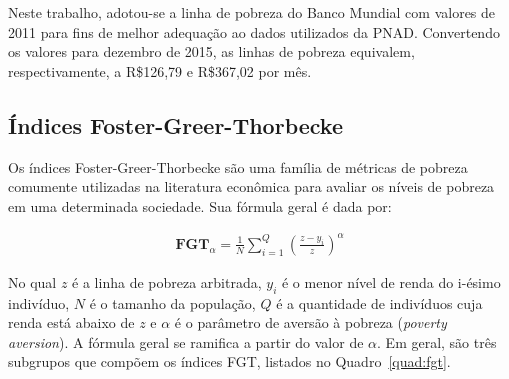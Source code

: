 Neste trabalho, adotou-se a linha de pobreza do Banco Mundial com valores de 2011 para fins de melhor adequação ao dados utilizados da PNAD. Convertendo os valores para dezembro de 2015, as linhas de pobreza equivalem, respectivamente, a R\$126,79 e R\$367,02 por mês. 


\subsection{Índices Foster-Greer-Thorbecke}

Os índices Foster-Greer-Thorbecke são uma família de métricas de pobreza comumente utilizadas na literatura econômica para avaliar os níveis de pobreza em uma determinada sociedade. Sua fórmula geral é dada por:

\begin{align}
	\textbf{FGT}_\alpha = \frac{1}{N} \sum_{i=1}^{Q} \left( \frac{z - y_i}{z} \right)^{\alpha}
\end{align}

No qual $z$ é a linha de pobreza arbitrada, $y_i$ é o menor nível de renda do i-ésimo indivíduo, $N$ é o tamanho da população, $Q$ é a quantidade de indivíduos cuja renda está abaixo de $z$ e $\alpha$ é o parâmetro de aversão à pobreza (\textit{poverty aversion}). A fórmula geral se ramifica a partir do valor de $\alpha$. Em geral, são três subgrupos que compõem os índices FGT, listados no Quadro~\ref{quad:fgt}.

